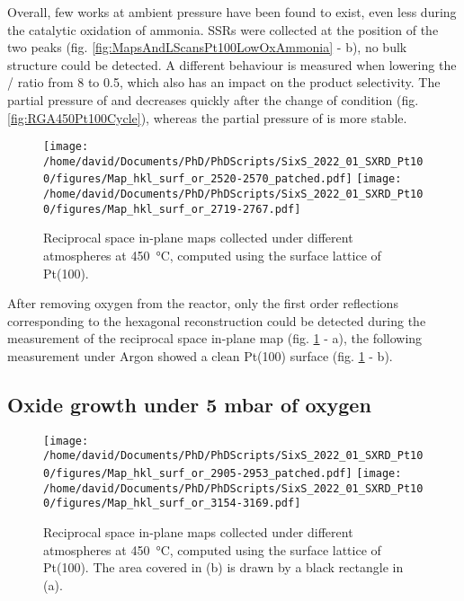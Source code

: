 Overall, few works at ambient pressure have been found to exist, even less during the catalytic oxidation of ammonia.
SSRs were collected at the position of the two peaks (fig. \ref{fig:MapsAndLScansPt100LowOxAmmonia} - b), no bulk structure could be detected.
A different behaviour is measured when lowering the / ratio from \num{8} to \num{0.5}, which also has an impact on the product selectivity.
The partial pressure of  and  decreases quickly after the change of condition (fig. \ref{fig:RGA450Pt100Cycle}), whereas the partial pressure of  is more stable.

\begin{figure}[!htb]
    \centering
    \texttt{[image: /home/david/Documents/PhD/PhDScripts/SixS\_2022\_01\_SXRD\_Pt100/figures/Map\_hkl\_surf\_or\_2520-2570\_patched.pdf]}
    \texttt{[image: /home/david/Documents/PhD/PhDScripts/SixS\_2022\_01\_SXRD\_Pt100/figures/Map\_hkl\_surf\_or\_2719-2767.pdf]}
    \caption{
        Reciprocal space in-plane maps collected under different atmospheres at \qty{450}{\degreeCelsius}, computed using the surface lattice of Pt(100).
    }
    \label{fig:MapsPt100C}
\end{figure}

After removing oxygen from the reactor, only the first order reflections corresponding to the hexagonal reconstruction could be detected during the measurement of the reciprocal space in-plane map (fig. \ref{fig:MapsPt100C} - a), the following measurement under Argon showed a clean Pt(100) surface (fig. \ref{fig:MapsPt100C} - b).

\subsection{Oxide growth under 5 mbar of oxygen}

\begin{figure}[!htb]
    \centering
    \texttt{[image: /home/david/Documents/PhD/PhDScripts/SixS\_2022\_01\_SXRD\_Pt100/figures/Map\_hkl\_surf\_or\_2905-2953\_patched.pdf]}
    \texttt{[image: /home/david/Documents/PhD/PhDScripts/SixS\_2022\_01\_SXRD\_Pt100/figures/Map\_hkl\_surf\_or\_3154-3169.pdf]}
    \caption{
        Reciprocal space in-plane maps collected under different atmospheres at \qty{450}{\degreeCelsius}, computed using the surface lattice of Pt(100).
        The area covered in (b) is drawn by a black rectangle in (a).
    }
    \label{fig:MapsPt100D}
\end{figure}

